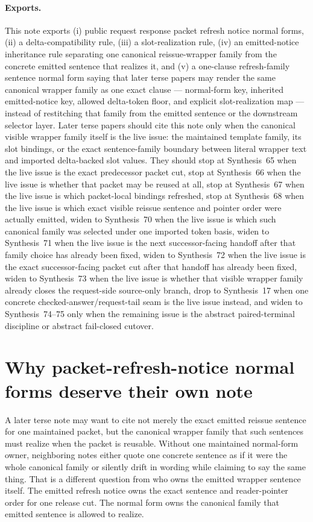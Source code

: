 \documentclass[11pt]{article}
\begin{document}
\paragraph{Exports.}
This note exports (i) public request response packet refresh notice normal forms, (ii) a delta-compatibility rule, (iii) a slot-realization rule, (iv) an emitted-notice inheritance rule separating one canonical reissue-wrapper family from the concrete emitted sentence that realizes it, and (v) a one-clause refresh-family sentence normal form saying that later terse papers may render the same canonical wrapper family as one exact clause --- normal-form key, inherited emitted-notice key, allowed delta-token floor, and explicit slot-realization map --- instead of restitching that family from the emitted sentence or the downstream selector layer.
Later terse papers should cite this note only when the canonical visible wrapper family itself is the live issue: the maintained template family, its slot bindings, or the exact sentence-family boundary between literal wrapper text and imported delta-backed slot values. They should stop at Synthesis~65 when the live issue is the exact predecessor packet cut, stop at Synthesis~66 when the live issue is whether that packet may be reused at all, stop at Synthesis~67 when the live issue is which packet-local bindings refreshed, stop at Synthesis~68 when the live issue is which exact visible reissue sentence and pointer order were actually emitted, widen to Synthesis~70 when the live issue is which such canonical family was selected under one imported token basis, widen to Synthesis~71 when the live issue is the next successor-facing handoff after that family choice has already been fixed, widen to Synthesis~72 when the live issue is the exact successor-facing packet cut after that handoff has already been fixed, widen to Synthesis~73 when the live issue is whether that visible wrapper family already closes the request-side source-only branch, drop to Synthesis~17 when one concrete checked-answer/request-tail seam is the live issue instead, and widen to Synthesis~74--75 only when the remaining issue is the abstract paired-terminal discipline or abstract fail-closed cutover.

\section{Why packet-refresh-notice normal forms deserve their own note}
A later terse note may want to cite not merely the exact emitted reissue sentence for one maintained packet, but the canonical wrapper family that such sentences must realize when the packet is reusable.
Without one maintained normal-form owner, neighboring notes either quote one concrete sentence as if it were the whole canonical family or silently drift in wording while claiming to say the same thing.
That is a different question from who owns the emitted wrapper sentence itself.
The emitted refresh notice owns the exact sentence and reader-pointer order for one release cut.
The normal form owns the canonical family that emitted sentence is allowed to realize.
\end{document}
